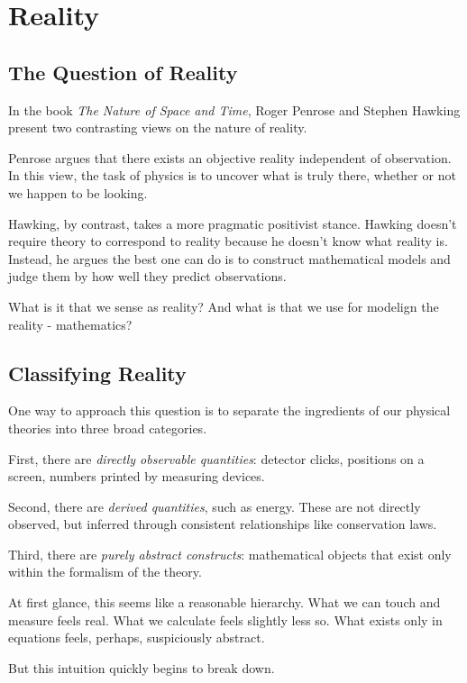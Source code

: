 \chapter{Reality}
\label{chap:reality}

\section{The Question of Reality}

In the book \textit{The Nature of Space and Time}, Roger Penrose and Stephen Hawking present two contrasting views on the nature of reality.

Penrose argues that there exists an objective reality independent of observation. In this view, the task of physics is to uncover what is truly there, whether or not we happen to be looking.

Hawking, by contrast, takes a more pragmatic positivist stance. Hawking doesn't require theory to correspond to reality
because he doesn't know what reality is. Instead, he argues the best one can do is to construct mathematical models and
judge them by how well they predict observations.

What is it that we sense as reality? And what is that we use for modelign the reality - mathematics?


\section{Classifying Reality}

One way to approach this question is to separate the ingredients of our physical theories into three broad categories.

First, there are \emph{directly observable quantities}: detector clicks, positions on a screen, numbers printed by measuring devices.

Second, there are \emph{derived quantities}, such as energy. These are not directly observed, but inferred through consistent relationships like conservation laws.

Third, there are \emph{purely abstract constructs}: mathematical objects that exist only within the formalism of the theory.

At first glance, this seems like a reasonable hierarchy. What we can touch and measure feels real. What we calculate feels slightly less so. What exists only in equations feels, perhaps, suspiciously abstract.

But this intuition quickly begins to break down.



